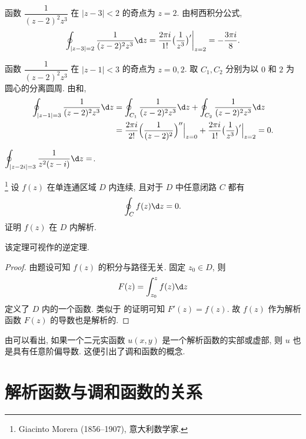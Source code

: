 \begin{solution}\delspace
  \begin{enumnopar}[(i)]
    \item 函数 $\dfrac1{(z-2)^2z^3}$ 在 $|z-3|<2$ 的奇点为 $z=2$.
      由柯西积分公式,
      \[
         \oint_{|z-3|=2}\frac1{(z-2)^2z^3}\d z
        =\frac{2\pi i}{1!}\bigl(\frac1{z^3}\bigr)'\bigg|_{z=2}
        =-\frac{3\pi i}8.
      \]
    \item 函数 $\dfrac1{(z-2)^2z^3}$ 在 $|z-1|<3$ 的奇点为 $z=0,2$.
      取 $C_1,C_2$ 分别为以 $0$ 和 $2$ 为圆心的分离圆周.
      由\thmCCC 和\thmCI,
      \begin{align*}
         \oint_{|z-1|=3}\frac1{(z-2)^2z^3}\d z
        &=\oint_{C_1}\frac1{(z-2)^2z^3}\d z+\oint_{C_2}\frac1{(z-2)^2z^3}\d z\\
        &=\frac{2\pi i}{2!}\Bigl(\frac1{(z-2)^2}\Bigr)''\Big|_{z=0}+\frac{2\pi i}{1!}\bigl(\frac1{z^3}\bigr)'\Big|_{z=2}=0.
      \end{align*}
  \end{enumnopar}
\end{solution}

\begin{exercise}
  $\displaystyle\oint_{|z-2i|=3}\frac1{z^2(z-i)}\d z=$\fillblank{}.
\end{exercise}

\begin{example}[莫累拉定理]\footnote{
  Giacinto Morera (1856--1907), 意大利数学家.
} 设 $f(z)$ 在单连通区域 $D$ 内连续, 且对于 $D$ 中任意闭路 $C$ 都有
  \[
    \oint_Cf(z)\d z=0.
  \]
  证明 $f(z)$ 在 $D$ 内解析.
\end{example}

该定理可视作\thmCG{}的逆定理.

\begin{proof}
  由题设可知 $f(z)$ 的积分与路径无关.
  固定 $z_0\in D$, 则
  \[
    F(z)=\int_{z_0}^zf(z)\d z
  \]
  定义了 $D$ 内的一个函数.
  类似于 的证明可知 $F'(z)=f(z)$.
  故 $f(z)$ 作为解析函数 $F(z)$ 的导数也是解析的.
\end{proof}

由\thmCIH 可以看出, 如果一个二元实函数 $u(x,y)$ 是一个解析函数的实部或虚部, 则 $u$ 也是具有任意阶偏导数.
这便引出了调和函数的概念.

\section{解析函数与调和函数的关系}

